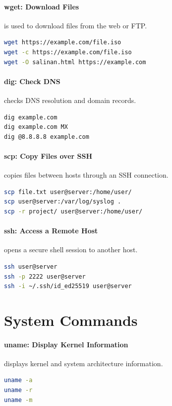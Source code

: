 \paragraph*{wget: Download Files}
 is used to download files from the web or FTP.
\begin{lstlisting}[language=bash]
wget https://example.com/file.iso
wget -c https://example.com/file.iso
wget -O salinan.html https://example.com
\end{lstlisting}

\paragraph*{dig: Check DNS}
 checks DNS resolution and domain records.
\begin{lstlisting}[language=bash]
dig example.com
dig example.com MX
dig @8.8.8.8 example.com
\end{lstlisting}

\paragraph*{scp: Copy Files over SSH}
 copies files between hosts through an SSH connection.
\begin{lstlisting}[language=bash]
scp file.txt user@server:/home/user/
scp user@server:/var/log/syslog .
scp -r project/ user@server:/home/user/
\end{lstlisting}

\paragraph*{ssh: Access a Remote Host}
 opens a secure shell session to another host.
\begin{lstlisting}[language=bash]
ssh user@server
ssh -p 2222 user@server
ssh -i ~/.ssh/id_ed25519 user@server
\end{lstlisting}

\section{System Commands}

\paragraph*{uname: Display Kernel Information}
 displays kernel and system architecture information.
\begin{lstlisting}[language=bash]
uname -a
uname -r
uname -m
\end{lstlisting}

